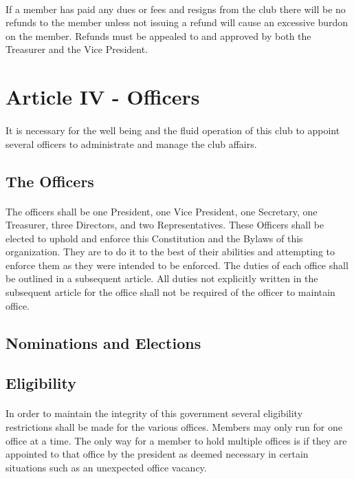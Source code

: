 \documentclass[12pt]{article}
\newcommand{\article}[1]{
\setcounter{section}{0}
	\section*{#1}
	\addcontentsline{toc}{section}{#1}
	
}
\begin{document}
\paragraph{}
If a member has paid any dues or fees and resigns from the club there will be no refunds to the member unless not issuing a refund will cause an excessive burdon on the member. Refunds must be appealed to and approved by both the Treasurer and the Vice President.


\article{Article IV - Officers}
\paragraph{}
It is necessary for the well being and the fluid operation of this club to appoint several officers to administrate and manage the club affairs.

\subsection{The Officers}
\paragraph{}
The officers shall be one President, one Vice President, one Secretary, one Treasurer, three Directors, and two Representatives. These Officers shall be elected to uphold and enforce this Constitution and the Bylaws of this organization. They are to do it to the best of their abilities and attempting to enforce them as they were intended to be enforced. The duties of each office shall be outlined in a subsequent article. All duties not explicitly written in the subsequent article for the office shall not be required of the officer to maintain office.

\subsection{Nominations and Elections}
\paragraph{}




\subsection{Eligibility}
\paragraph{}
In order to maintain the integrity of this government several eligibility restrictions shall be made for the various offices. Members may only run for one office at a time. The only way for a member
to hold multiple offices is if they are appointed to that office by the president as deemed necessary in certain situations such as an unexpected office vacancy.
\end{document}
